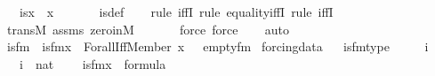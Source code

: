 \begin{isabellebody}
\ \ \ {\isachardoublequoteopen}is{\isacharunderscore}{\kern0pt}{}{\isacharparenleft}{\kern0pt}x{\isacharparenright}{\kern0pt}\ {\isasymlongleftrightarrow}\ x\ {\isacharequal}{\kern0pt}\ {}{\isachardoublequoteclose}\ \isanewline
%
\isadelimproof
\ \ %
\endisadelimproof
%
\isatagproof
{}\isamarkupfalse%
\ is{\isacharunderscore}{\kern0pt}{}{\isacharunderscore}{\kern0pt}def\ \isanewline
\ \ \isamarkupfalse%
{\isacharparenleft}{\kern0pt}rule\ iffI{\isacharcomma}{\kern0pt}\ rule\ equality{\isacharunderscore}{\kern0pt}iffI{\isacharcomma}{\kern0pt}\ rule\ iffI{\isacharparenright}{\kern0pt}\isanewline
\ \ \isamarkupfalse%
\ transM\ assms\ zero{\isacharunderscore}{\kern0pt}in{\isacharunderscore}{\kern0pt}M\ \isanewline
\ \ \ \ \isamarkupfalse%
\ {\isacharparenleft}{\kern0pt}force{\isacharcomma}{\kern0pt}\ force{\isacharparenright}{\kern0pt}\isanewline
\ \ \isamarkupfalse%
\ auto%
\endisatagproof
{\isafoldproof}%
%
\isadelimproof
\isanewline
%
\endisadelimproof
\isanewline
{}\isamarkupfalse%
\isanewline
\isanewline
{}\isamarkupfalse%
\ is{\isacharunderscore}{\kern0pt}{}{\isacharunderscore}{\kern0pt}fm\ \ {\isachardoublequoteopen}is{\isacharunderscore}{\kern0pt}{}{\isacharunderscore}{\kern0pt}fm{\isacharparenleft}{\kern0pt}x{\isacharparenright}{\kern0pt}\ {\isasymequiv}\ Forall{\isacharparenleft}{\kern0pt}Iff{\isacharparenleft}{\kern0pt}Member{\isacharparenleft}{\kern0pt}{}{\isacharcomma}{\kern0pt}\ x\ {\isacharhash}{\kern0pt}{\isacharplus}{\kern0pt}\ {}{\isacharparenright}{\kern0pt}{\isacharcomma}{\kern0pt}\ empty{\isacharunderscore}{\kern0pt}fm{\isacharparenleft}{\kern0pt}{}{\isacharparenright}{\kern0pt}{\isacharparenright}{\kern0pt}{\isacharparenright}{\kern0pt}{\isachardoublequoteclose}\isanewline
\isanewline
{}\isamarkupfalse%
\ forcing{\isacharunderscore}{\kern0pt}data\isanewline
{}\ \isanewline
\isanewline
{}\isamarkupfalse%
\ is{\isacharunderscore}{\kern0pt}{}{\isacharunderscore}{\kern0pt}fm{\isacharunderscore}{\kern0pt}type\ {\isacharcolon}{\kern0pt}\ \isanewline
\ \ \ i\ \isanewline
\ \ \ {\isachardoublequoteopen}i\ {\isasymin}\ nat{\isachardoublequoteclose}\ \isanewline
\ \ \ {\isachardoublequoteopen}is{\isacharunderscore}{\kern0pt}{}{\isacharunderscore}{\kern0pt}fm{\isacharparenleft}{\kern0pt}x{\isacharparenright}{\kern0pt}\ {\isasymin}\ formula{\isachardoublequoteclose}\ \isanewline

\end{isabellebody}
